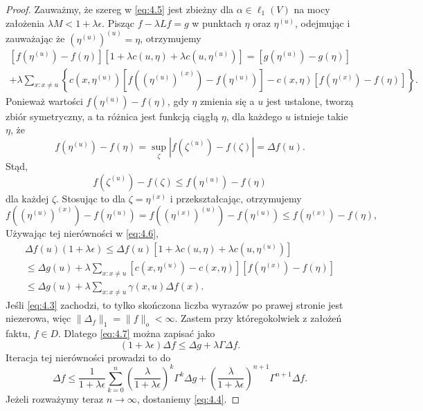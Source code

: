 \documentclass{article}
\begin{document}
\begin{proof}
	Zauważmy, że szereg w \eqref{eq:4.5} jest zbieżny dla $\alpha \in \ell_1(V)$ 
	na mocy założenia $\lambda M < 1 + \lambda \epsilon$. 
	Pisząc $f - \lambda Lf = g$ w punktach $\eta$ oraz $\eta^{(u)}$, odejmując i
	zauważając że $(\eta^{(u)})^{(u)} = \eta$, otrzymujemy
	\begin{multline}\label{eq:4.6}
		[f(\eta^{(u)}) - f(\eta)][1 + \lambda c(u, \eta) + \lambda c(u, \eta^{(u)})] 
		= [g(\eta^{(u)}) - g(\eta)]\\
		+ \lambda \sum_{x:x \neq u} \left\{ c(x, \eta^{(u)}) [f((\eta^{(u)})^{(x)}) 
		- f(\eta^{(u)})] - c(x, \eta)[f(\eta^{(x)}) - f(\eta)] \right\}.
	\end{multline}
	Ponieważ wartości $f(\eta^{(u)}) - f(\eta)$, gdy $\eta$ zmienia się a $u$ jest ustalone, 
	tworzą zbiór symetryczny, a ta różnica jest funkcją ciągłą $\eta$, 
	dla każdego $u$ istnieje takie $\eta$, że
	\[
		f(\eta^{(u)}) - f(\eta) = \sup_{\zeta} |f(\zeta^{(u)}) - f(\zeta)| = \Delta f(u).
	\]
	Stąd,
	\[
		f(\zeta^{(u)}) - f(\zeta) \leq f(\eta^{(u)}) - f(\eta)
	\]
	dla każdej $\zeta$. Stosując to dla $\zeta = \eta^{(x)}$ i przekształcając, otrzymujemy
	\[
		f((\eta^{(u)})^{(x)}) - f(\eta^{(u)}) 
		= f((\eta^{(x)})^{(u)}) - f(\eta^{(u)}) \leq f(\eta^{(x)}) - f(\eta),
	\]
	Używając tej nierówności w \eqref{eq:4.6},
	\begin{multline}\label{eq:4.7}
		\Delta f(u)(1 + \lambda \epsilon) \leq 
		\Delta f(u)[1 + \lambda c(u, \eta) + \lambda c(u, \eta^{(u)})] \\
		\leq \Delta g(u) + \lambda \sum_{x:x \neq u} 
		\left[ c(x, \eta^{(u)}) - c(x, \eta) \right] [f(\eta^{(x)}) - f(\eta)]
		\\ \leq \Delta g(u) + \lambda \sum_{x:x \neq u} \gamma(x,u) \Delta f(x).
	\end{multline}
	Jeśli \eqref{eq:4.3} zachodzi, to tylko skończona liczba wyrazów po 
	prawej stronie jest niezerowa, więc 
	$\|\Delta_f\|_1 = \|f\|_o <\infty$. 
	Zastem przy któregokolwiek z założeń faktu, 
	$f \in D$. 
	Dlatego \eqref{eq:4.7} można zapisać jako
	\[
		(1 + \lambda \epsilon) \Delta f \leq \Delta g + \lambda \Gamma \Delta f.
	\]
	Iteracja tej nierówności prowadzi to do
	\[
		\Delta f \leq \frac{1}{1 + \lambda \epsilon} 
		\sum_{k=0}^{n} \left( \frac{\lambda}{1 + \lambda \epsilon} \right)^k 
		\Gamma^k \Delta g + \left( \frac{\lambda}{1 + \lambda \epsilon} \right)^{n+1} 
		\Gamma^{n+1} \Delta f.
	\]
	Jeżeli rozważymy teraz $n \to \infty$, dostaniemy \eqref{eq:4.4}.
\end{proof}
\end{document}
